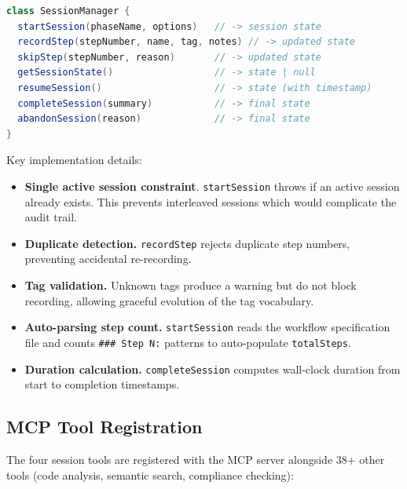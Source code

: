 \documentclass[11pt,letterpaper]{article}
\begin{document}
\begin{lstlisting}[language=Java,caption={SessionManager API},label=lst:api]
class SessionManager {
  startSession(phaseName, options)   // -> session state
  recordStep(stepNumber, name, tag, notes) // -> updated state
  skipStep(stepNumber, reason)       // -> updated state
  getSessionState()                  // -> state | null
  resumeSession()                    // -> state (with timestamp)
  completeSession(summary)           // -> final state
  abandonSession(reason)             // -> final state
}
\end{lstlisting}

Key implementation details:

\begin{itemize}[nosep]
    \item \textbf{Single active session constraint}.
          \texttt{startSession} throws if an active session already
          exists.  This prevents interleaved sessions which would
          complicate the audit trail.
    \item \textbf{Duplicate detection.}
          \texttt{recordStep} rejects duplicate step numbers, preventing
          accidental re-recording.
    \item \textbf{Tag validation.}
          Unknown tags produce a warning but do not block recording,
          allowing graceful evolution of the tag vocabulary.
    \item \textbf{Auto-parsing step count.}
          \texttt{startSession} reads the workflow specification file
          and counts \texttt{\#\#\# Step N:} patterns to auto-populate
          \texttt{totalSteps}.
    \item \textbf{Duration calculation.}
          \texttt{completeSession} computes wall-clock duration from
          start to completion timestamps.
\end{itemize}

\subsection{MCP Tool Registration}

The four session tools are registered with the MCP server alongside
38+ other tools (code analysis, semantic search, compliance checking):
\end{document}
